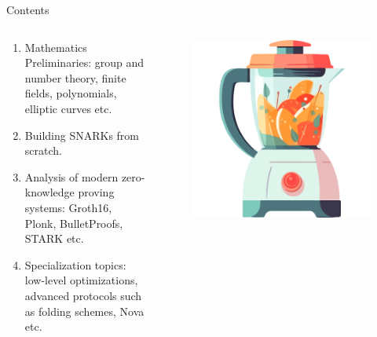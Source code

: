 \documentclass{beamer}
\begin{document}
    \begin{frame}{Contents}

      \begin{columns}
        \begin{column}{0.65\textwidth}
          \begin{enumerate}
            \item Mathematics Preliminaries: group and number theory, finite fields, polynomials, elliptic curves etc.
            \item Building SNARKs from scratch.
            \item Analysis of modern zero-knowledge proving systems: Groth16, Plonk, BulletProofs, STARK etc.
            \item Specialization topics: low-level optimizations, advanced protocols such as folding schemes, Nova etc.
          \end{enumerate}
        \end{column}
        \begin{column}{0.35\textwidth}
            \begin{figure}
            \centering
                \includegraphics[width=\textwidth]{images/lecture_1/blender.png}
            \end{figure}
        \end{column}
        \end{columns}
    \end{frame}
\end{document}
